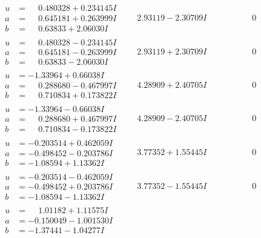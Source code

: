 \documentclass[1p]{elsarticle_modified}
\theoremstyle{definition}
\begin{document}
$$\begin{array}{c|c|c}
\begin{aligned}
u &= \phantom{-}0.480328 + 0.234145 I \\
a &= \phantom{-}0.645181 + 0.263999 I \\
b &= \phantom{-}0.63833 + 2.06030 I\end{aligned}
 & \phantom{-}2.93119 - 2.30709 I & \phantom{-0.000000 } 0 \\ \hline\begin{aligned}
u &= \phantom{-}0.480328 - 0.234145 I \\
a &= \phantom{-}0.645181 - 0.263999 I \\
b &= \phantom{-}0.63833 - 2.06030 I\end{aligned}
 & \phantom{-}2.93119 + 2.30709 I & \phantom{-0.000000 } 0 \\ \hline\begin{aligned}
u &= -1.33964 + 0.66038 I \\
a &= \phantom{-}0.288680 - 0.467997 I \\
b &= \phantom{-}0.710834 + 0.173822 I\end{aligned}
 & \phantom{-}4.28909 + 2.40705 I & \phantom{-0.000000 } 0 \\ \hline\begin{aligned}
u &= -1.33964 - 0.66038 I \\
a &= \phantom{-}0.288680 + 0.467997 I \\
b &= \phantom{-}0.710834 - 0.173822 I\end{aligned}
 & \phantom{-}4.28909 - 2.40705 I & \phantom{-0.000000 } 0 \\ \hline\begin{aligned}
u &= -0.203514 + 0.462059 I \\
a &= -0.498452 - 0.203786 I \\
b &= -1.08594 + 1.13362 I\end{aligned}
 & \phantom{-}3.77352 + 1.55445 I & \phantom{-0.000000 } 0 \\ \hline\begin{aligned}
u &= -0.203514 - 0.462059 I \\
a &= -0.498452 + 0.203786 I \\
b &= -1.08594 - 1.13362 I\end{aligned}
 & \phantom{-}3.77352 - 1.55445 I & \phantom{-0.000000 } 0 \\ \hline\begin{aligned}
u &= \phantom{-}1.01182 + 1.11575 I \\
a &= -0.150049 - 1.001530 I \\
b &= -1.37441 - 1.04277 I\end{aligned}

\end{array}$$
\end{document}
